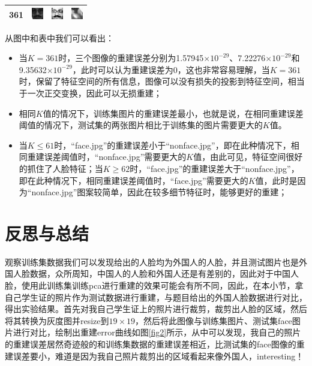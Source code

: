 \documentclass[cn]{elegantbook}
\begin{document}
\begin{table}[!ht]
\begin{tabular}{|c|c|c|c|}
		\hline 
		361 & \includegraphics{../results/face00018_361}& \includegraphics{../results/face_361}& \includegraphics{../results/nonface_361} \\
		\hline
	\end{tabular}
\end{table}

从图中和表中我们可以看出：
\begin{itemize}
	\item 当$K=361$时，三个图像的重建误差分别为1.57945$\times 10 ^{-29}$、7.22276$\times 10 ^{-29}$和9.35632$\times 10 ^{-29}$，此时可以认为重建误差为0，这也非常容易理解，当$K=361$时，保留了特征空间的所有信息，图像可以没有损失的投影到特征空间，相当于一次正交变换，因此可以无损重建；
	\item 相同$K$值的情况下，训练集图片的重建误差最小，也就是说，在相同重建误差阈值的情况下，测试集的两张图片相比于训练集的图片需要更大的$K$值。
	\item 当$K\le 61$时，“face.jpg”的重建误差小于“nonface.jpg”，即在此种情况下，相同重建误差阈值时，“nonface.jpg”需要更大的$K$值，由此可见，特征空间很好的抓住了人脸特征；当$K\ge 62$时，“face.jpg”的重建误差大于“nonface.jpg”，即在此种情况下，相同重建误差阈值时，“face.jpg”需要更大的$K$值，此时是因为“nonface.jpg”图案较简单，因此在较多细节特征时，能够更好的重建；
\end{itemize}

\section{反思与总结}
观察训练集数据我们可以发现给出的人脸均为外国人的人脸，并且测试图片也是外国人脸数据，众所周知，中国人的人脸和外国人还是有差别的，因此对于中国人脸，使用此训练集训练pca进行重建的效果可能会有所不同，因此，在本小节，拿自己学生证的照片作为测试数据进行重建，与题目给出的外国人脸数据进行对比，得出实验结果。首先对我自己学生证上的照片进行裁剪，裁剪出人脸的区域，然后将其转换为灰度图并resize到$19\times19$，然后将此图像与训练集图片、测试集face图片进行对比，绘制出重建error曲线如图\ref{fig2}所示，从中可以发现，我自己的照片的重建误差居然奇迹般的和训练集数据的重建误差相近，比测试集的face图像的重建误差要小，难道是因为我自己照片裁剪出的区域看起来像外国人，interesting！
\end{document}
